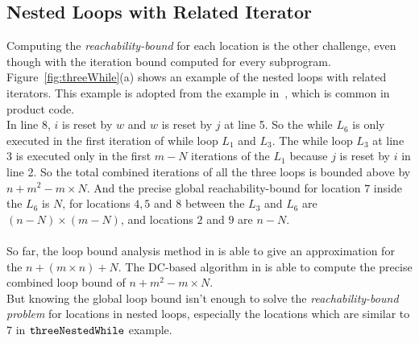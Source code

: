 \subsection{Nested Loops with Related Iterator}
\label{sec:overview-nestedwhile}
Computing the \emph{reachability-bound} for each location is the other challenge, even though with
the
iteration bound computed for every subprogram.
Figure~\ref{fig:threeWhile}(a) shows an example of the nested loops with related 
iterators.
This example is adopted from the example in~\cite{GulwaniJK09}, which is common in product code.
\\
In line 8, $i$ is reset by $w$ and $w$ is reset by $j$ at line 5. So the
while $L_6$ is only executed in the first iteration of while loop $L_1$ and $L_3$.
The while loop $L_3$ at line 3 is executed only in 
the first $m - N$ iterations of the 
$L_1$ because $j$ is reset by $i$ in line 2.
So the total combined iterations of all the three loops is bounded above by 
$n + m^2 - m \times N$.
And the precise global reachability-bound for location $7$ inside the $L_6$ is $N$,
for locations $4, 5$ and $8$ between the $L_3$ and $L_6$ are $(n-N) \times (m - N)$,
and locations $2$ and $9$ are $n - N$.
\\
\\
So far, the loop bound analysis method in \cite{GulwaniJK09} is able to give
an approximation for the $n + (m \times n) + N$. 
The DC-based algorithm in \cite{sinn2017complexity} is able to
compute the precise combined loop bound of $n + m^2 - m \times N$.
\\
But knowing the global loop bound isn't enough to solve the \emph{reachability-bound problem} for locations in nested loops,
especially the locations which are similar to $7$ in ${\mathtt{threeNestedWhile}}$ example.
\\
